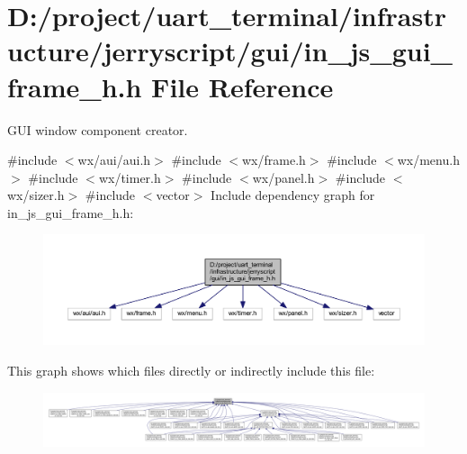 \section{D\+:/project/uart\+\_\+terminal/infrastructure/jerryscript/gui/in\+\_\+js\+\_\+gui\+\_\+frame\+\_\+h.h File Reference}
\label{in__js__gui__frame__h_8h}


G\+UI window component creator.  


{\ttfamily \#include $<$wx/aui/aui.\+h$>$}\newline
{\ttfamily \#include $<$wx/frame.\+h$>$}\newline
{\ttfamily \#include $<$wx/menu.\+h$>$}\newline
{\ttfamily \#include $<$wx/timer.\+h$>$}\newline
{\ttfamily \#include $<$wx/panel.\+h$>$}\newline
{\ttfamily \#include $<$wx/sizer.\+h$>$}\newline
{\ttfamily \#include $<$vector$>$}\newline
Include dependency graph for in\+\_\+js\+\_\+gui\+\_\+frame\+\_\+h.\+h\+:
\nopagebreak
\begin{figure}[H]
\begin{center}
\leavevmode
\includegraphics[width=350pt]{in__js__gui__frame__h_8h__incl}
\end{center}
\end{figure}
This graph shows which files directly or indirectly include this file\+:
\nopagebreak
\begin{figure}[H]
\begin{center}
\leavevmode
\includegraphics[width=350pt]{in__js__gui__frame__h_8h__dep__incl}
\end{center}
\end{figure}
